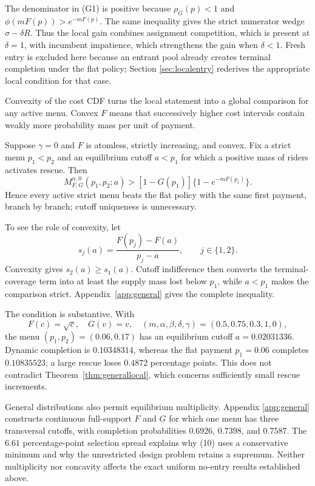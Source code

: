 \documentclass[mnsc,blindrev]{informs3}
\newcommand{\ph}{\phi}
\begin{document}
The denominator in (G1) is positive because $\rho_G(p)<1$ and
$\ph(mF(p))>e^{-mF(p)}$.  The same inequality gives the strict numerator
wedge $\sigma-\delta R$.  Thus the local gain combines assignment competition,
which is present at $\delta=1$, with incumbent impatience, which strengthens
the gain when $\delta<1$.  Fresh entry is excluded here because an entrant
pool already creates terminal completion under the flat policy; Section
\ref{sec:localentry} rederives the appropriate local condition for that case.

Convexity of the cost CDF turns the local statement into a global comparison
for any active menu.  Convex $F$ means that successively higher cost intervals
contain weakly more probability mass per unit of payment.

\begin{theorem}
\label{thm:convexF}
Suppose $\gamma=0$ and $F$ is atomless, strictly increasing, and convex.
Fix a strict menu $p_1<p_2$ and an equilibrium cutoff $a<p_1$ for which a
positive mass of riders activates rescue.  Then
\[
 M_{F,G}^{\alpha,0}(p_1,p_2;a)
 >[1-G(p_1)]\{1-e^{-mF(p_1)}\}.                          \tag{G3}
\]
Hence every active strict menu beats the flat policy with the same first
payment, branch by branch; cutoff uniqueness is unnecessary.
\end{theorem}

To see the role of convexity, let
\[
 s_j(a)=\frac{F(p_j)-F(a)}{p_j-a},\qquad j\in\{1,2\}.
\]
Convexity gives $s_2(a)\ge s_1(a)$.  Cutoff indifference then converts the
terminal-coverage term into at least the supply mass lost below $p_1$, while
$a<p_1$ makes the comparison strict.  Appendix~\ref{app:general} gives the
complete inequality.

The condition is substantive.  With
\[
 F(c)=\sqrt c,\quad G(v)=v,\quad
 (m,\alpha,\beta,\delta,\gamma)=(0.5,0.75,0.3,1,0),
\]
the menu $(p_1,p_2)=(0.06,0.17)$ has an equilibrium cutoff
$a=0.02031336$.  Dynamic completion is $0.10348314$, whereas the flat payment
$p_1=0.06$ completes $0.10835523$; a large rescue loses $0.4872$ percentage
points.  This does not contradict Theorem~\ref{thm:generallocal}, which concerns
sufficiently small rescue increments.

General distributions also permit equilibrium multiplicity.  Appendix
\ref{app:general} constructs continuous full-support $F$ and $G$ for which one
menu has three transversal cutoffs, with completion probabilities $0.6926$,
$0.7398$, and $0.7587$.  The $6.61$ percentage-point selection spread explains
why (10) uses a conservative minimum and why the unrestricted design problem
retains a supremum.  Neither multiplicity nor concavity affects the exact
uniform no-entry results established above.
\end{document}
